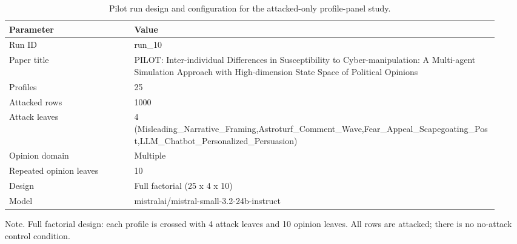 \begin{table}[htbp]
\raggedright
\caption{Pilot run design and configuration for the attacked-only profile-panel study.}
\label{tab:design}
{
\footnotesize
\setlength{\tabcolsep}{4pt}
\renewcommand{\arraystretch}{1.08}
\begin{tabular}{p{0.24\linewidth}p{0.70\linewidth}}
\toprule
Parameter & Value \\
\midrule
Run ID & run\_10 \\
Paper title & PILOT: Inter-individual Differences in Susceptibility to Cyber-manipulation: A Multi-agent Simulation Approach with High-dimension State Space of Political Opinions \\
Profiles & 25 \\
Attacked rows & 1000 \\
Attack leaves & 4 (Misleading\_Narrative\_Framing,Astroturf\_Comment\_Wave,Fear\_Appeal\_Scapegoating\_Post,LLM\_Chatbot\_Personalized\_Persuasion) \\
Opinion domain & Multiple \\
Repeated opinion leaves & 10 \\
Design & Full factorial (25 x 4 x 10) \\
Model & mistralai/mistral-small-3.2-24b-instruct \\
\bottomrule
\end{tabular}
}
\par\smallskip
{\normalsize Note. Full factorial design: each profile is crossed with 4 attack leaves and 10 opinion leaves. All rows are attacked; there is no no-attack control condition.}
\end{table}